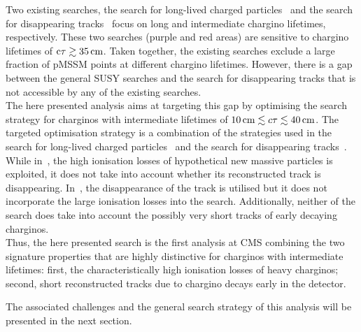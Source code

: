 Two existing searches, the search for long-lived charged particles~\cite{bib:CMS:HSCP_8TeV} and the search for disappearing tracks~\cite{bib:CMS:DT_8TeV} focus on long and intermediate chargino lifetimes, respectively. 
These two searches (purple and red areas) are sensitive to chargino lifetimes of $\text{c}\tau \gtrsim 35\,\text{cm}$.
Taken together, the existing searches exclude a large fraction of pMSSM points at different chargino lifetimes. 
However, there is a gap between the general SUSY searches and the search for disappearing tracks that is not accessible by any of the existing searches.\\

The here presented analysis aims at targeting this gap by optimising the search strategy for charginos with intermediate lifetimes of $10\,\text{cm} \lesssim c\tau \lesssim 40\,\text{cm}$. 
The targeted optimisation strategy is a combination of the strategies used in the search for long-lived charged particles~\cite{bib:CMS:HSCP_8TeV} and the search for disappearing tracks~\cite{bib:CMS:DT_8TeV}.
While in~\cite{bib:CMS:HSCP_8TeV}, the high ionisation losses of hypothetical new massive particles is exploited, it does not take into account whether its reconstructed track is disappearing.
In~\cite{bib:CMS:DT_8TeV}, the disappearance of the track is utilised but it does not incorporate the large ionisation losses into the search.
Additionally, neither of the search does take into account the possibly very short tracks of early decaying charginos.\\

Thus, the here presented search is the first analysis at CMS combining the two signature properties that are highly distinctive for charginos with intermediate lifetimes: 
first, the characteristically high ionisation losses of heavy charginos;
second, short reconstructed tracks due to chargino decays early in the detector. 

The associated challenges and the general search strategy of this analysis will be presented in the next section.

